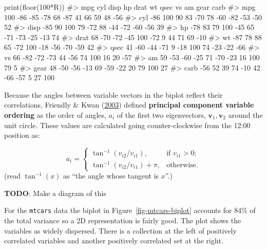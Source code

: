 \documentclass[
  letterpaper,
  10pt,
  krantz2]{krantz}
\makeatletter
\newenvironment{Shaded}{\begin{snugshade}}{\end{snugshade}}
\newcommand{\CommentTok}[1]{\textcolor[rgb]{0.37,0.37,0.37}{#1}}
\newcommand{\DecValTok}[1]{\textcolor[rgb]{0.68,0.00,0.00}{#1}}
\newcommand{\FunctionTok}[1]{\textcolor[rgb]{0.28,0.35,0.67}{#1}}
\newcommand{\NormalTok}[1]{\textcolor[rgb]{0.00,0.23,0.31}{#1}}
\newcommand{\SpecialCharTok}[1]{\textcolor[rgb]{0.37,0.37,0.37}{#1}}
\newenvironment{kframe}{%
  \medskip{}
  \setlength{\fboxsep}{.8em}
  \def\at@end@of@kframe{}%
  \ifinner\ifhmode%
  \def\at@end@of@kframe{\end{minipage}}%
  \begin{minipage}{\columnwidth}%
  \fi\fi%
  \def\FrameCommand##1{\hskip\@totalleftmargin \hskip-\fboxsep
  \colorbox{shadecolor}{##1}\hskip-\fboxsep
      \hskip-\linewidth \hskip-\@totalleftmargin \hskip\columnwidth}%
  \MakeFramed {\advance\hsize-\width
    \@totalleftmargin\z@ \linewidth\hsize
    \@setminipage}}%
{\par\unskip\endMakeFramed%
  \at@end@of@kframe}
\renewenvironment{Shaded}{\begin{kframe}}{\end{kframe}}
\makeatother
\begin{document}
\begin{Shaded}
\begin{Highlighting}[]
\FunctionTok{print}\NormalTok{(}\FunctionTok{floor}\NormalTok{(}\DecValTok{100}\SpecialCharTok{*}\NormalTok{R))}
\CommentTok{\#\textgreater{}      mpg cyl disp  hp drat  wt qsec  vs  am gear carb}
\CommentTok{\#\textgreater{} mpg  100 {-}86  {-}85 {-}78   68 {-}87   41  66  59   48  {-}56}
\CommentTok{\#\textgreater{} cyl  {-}86 100   90  83  {-}70  78  {-}60 {-}82 {-}53  {-}50   52}
\CommentTok{\#\textgreater{} disp {-}85  90  100  79  {-}72  88  {-}44 {-}72 {-}60  {-}56   39}
\CommentTok{\#\textgreater{} hp   {-}78  83   79 100  {-}45  65  {-}71 {-}73 {-}25  {-}13   74}
\CommentTok{\#\textgreater{} drat  68 {-}70  {-}72 {-}45  100 {-}72    9  44  71   69  {-}10}
\CommentTok{\#\textgreater{} wt   {-}87  78   88  65  {-}72 100  {-}18 {-}56 {-}70  {-}59   42}
\CommentTok{\#\textgreater{} qsec  41 {-}60  {-}44 {-}71    9 {-}18  100  74 {-}23  {-}22  {-}66}
\CommentTok{\#\textgreater{} vs    66 {-}82  {-}72 {-}73   44 {-}56   74 100  16   20  {-}57}
\CommentTok{\#\textgreater{} am    59 {-}53  {-}60 {-}25   71 {-}70  {-}23  16 100   79    5}
\CommentTok{\#\textgreater{} gear  48 {-}50  {-}56 {-}13   69 {-}59  {-}22  20  79  100   27}
\CommentTok{\#\textgreater{} carb {-}56  52   39  74  {-}10  42  {-}66 {-}57   5   27  100}
\end{Highlighting}
\end{Shaded}

Because the angles between variable vectors in the biplot reflect their
correlations, Friendly \& Kwan
(\protect\hyperlink{ref-FriendlyKwan:03:effect}{2003}) defined
\textbf{principal component variable ordering} as the order of angles,
\(a_i\) of the first two eigenvectors, \(\mathbf{v}_1, \mathbf{v}_2\)
around the unit circle. These values are calculated going
counter-clockwise from the 12:00 position as:

\[
a_i = 
  \begin{cases}
    \tan^{-1} (v_{i2}/v_{i1}), & \text{if $v_{i1}>0$;}
     \\
    \tan^{-1} (v_{i2}/v_{i1}) + \pi, & \text{otherwise.}
  \end{cases}     
\] (read \(\tan^{-1}(x)\) as ``the angle whose tangent is \(x\)''.)

\textbf{TODO}: Make a diagram of this

For the \texttt{mtcars} data the biplot in
Figure~\ref{fig-mtcars-biplot} accounts for 84\% of the total variance
so a 2D representation is fairly good. The plot shows the variables as
widely dispersed. There is a collection at the left of positively
correlated variables and another positively correlated set at the right.
\end{document}
